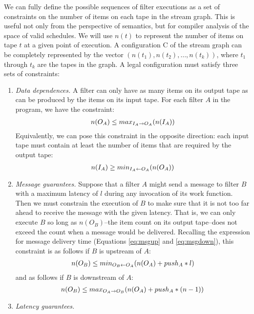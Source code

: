 We can fully define the possible sequences of filter executions as a
set of constraints on the number of items on each tape in the stream
graph.  This is useful not only from the perspective of semantics, but
for compiler analysis of the space of valid schedules.  We will use
$n(t)$ to represent the number of items on tape $t$ at a given point
of execution.  A configuration C of the stream graph can be completely
represented by the vector $(n(t_1), n(t_2), \dots, n(t_k))$, where
$t_1$ through $t_k$ are the tapes in the graph.  A legal configuration
must satisfy three sets of constraints:

\begin{enumerate}

\item {\it Data dependences.}  A filter can only have as many items on
its output tape as can be produced by the items on its input tape.
For each filter $A$ in the program, we have the constraint:
\begin{eqnarray*}
n(O_A) \le max_{I_A \rightarrow O_A}(n(I_A))
\end{eqnarray*}
Equivalently, we can pose this constraint in the opposite direction:
each input tape must contain at least the number of items that are
required by the output tape:
\begin{eqnarray*}
n(I_A) \ge min_{I_A \leftarrow O_A}(n(O_A))
\end{eqnarray*}

\item {\it Message guarantees.}  Suppose that a filter $A$ might send
a message to filter $B$ with a maximum latency of $l$ during any
invocation of its work function.  Then we must constrain the execution
of $B$ to make sure that it is not too far ahead to receive the
message with the given latency.  That is, we can only execute $B$ so
long as $n(O_B)$--the item count on its output tape--does not exceed
the count when a message would be delivered.  Recalling the expression
for message delivery time (Equations \ref{eq:msgup} and
\ref{eq:msgdown}), this constraint is as follows if $B$ is upstream of $A$:
\begin{eqnarray*}
n(O_B) \le min_{O_B \leftarrow O_A}(n(O_A) + push_A * l)
\end{eqnarray*}
and as follows if $B$ is downstream of $A$:
\begin{eqnarray*}
n(O_B) \le max_{O_A \rightarrow O_B}(n(O_A) + push_A * (n-1))
\end{eqnarray*}

\item {\it Latency guarantees.}

\end{enumerate}

